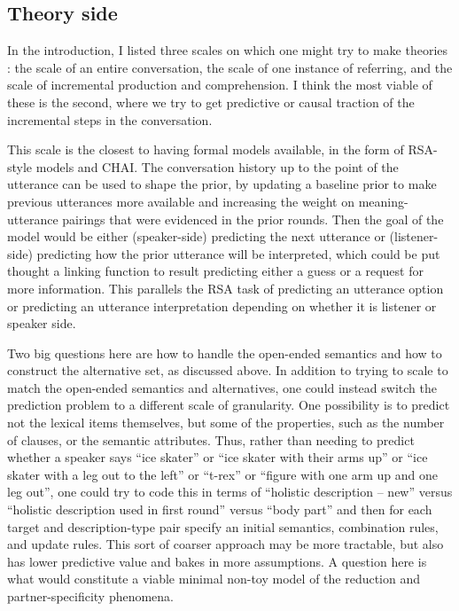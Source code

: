 \documentclass[]{article}
\begin{document}
	\subsection{Theory side}
	
	
	In the introduction, I listed three scales on which one might try to make theories %
	: the scale of an entire conversation, the scale of one instance of referring, and the scale of incremental production and comprehension. 
	I think the most viable of these is the second, where we try to get predictive or causal traction of the incremental steps in the conversation. 
	
	This scale is the closest to having formal models available, in the form of RSA-style models and CHAI. The conversation history up to the point of the utterance can be used to shape the prior, by updating a baseline prior to make previous utterances more available and increasing the weight on meaning-utterance pairings that were evidenced in the prior rounds. Then the goal of the model would be either (speaker-side) predicting the next utterance or (listener-side) predicting how the prior utterance will be interpreted, which could be put thought a linking function to result predicting either a guess or a request for more information. This parallels the RSA task of predicting an utterance option or predicting an utterance interpretation depending on whether it is listener or speaker side. 
	
	Two big questions here are how to handle the open-ended semantics and how to construct the alternative set, as discussed above. In addition to trying to scale to match the open-ended semantics and alternatives, one could instead switch the prediction problem to a different scale of granularity. One possibility is to predict not the lexical items themselves, but some of the properties, such as the number of clauses, or the semantic attributes. Thus, rather than needing to predict whether a speaker says ``ice skater'' or ``ice skater with their arms up'' or ``ice skater with a leg out to the left'' or ``t-rex'' or ``figure with one arm up and one leg out'', one could try to code this in terms of ``holistic description -- new'' versus ``holistic description used in first round'' versus ``body part'' and then for each target and description-type pair specify an initial semantics, combination rules, and update rules. This sort of coarser approach may be more tractable, but also has lower predictive value and bakes in more assumptions. A question here is what would constitute a viable minimal non-toy model of the reduction and partner-specificity phenomena. 
	
\end{document}
